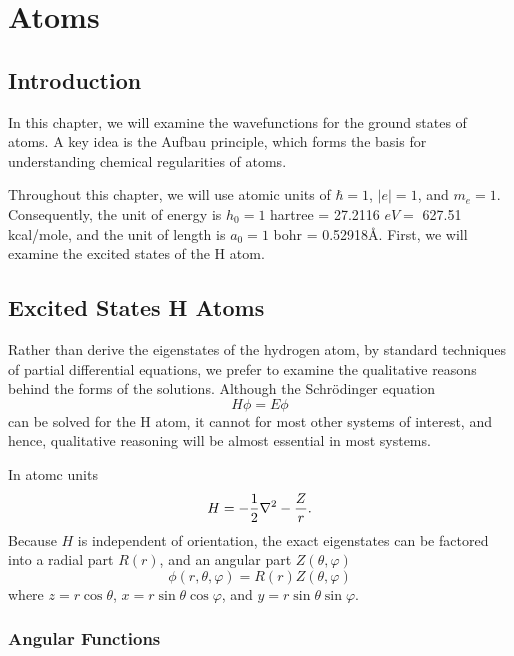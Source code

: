 \chapter{Atoms}
\label{chap05}

\section{Introduction}

In this chapter, we will examine the wavefunctions for the ground states 
of atoms.  A key idea is the Aufbau principle, which forms the basis for 
understanding chemical regularities of atoms.

Throughout this chapter, we will use atomic units of $\hbar = 1$, $| e | = 
1$, and $m_e = 1$.  Consequently, the unit of energy is $h_0 = 1$ 
hartree = 27.2116 $eV =$ 627.51 kcal/mole, and the unit of length is $a_0 = 
1$  bohr = 0.52918\AA.  First, we will examine the excited states of the H atom.

\section{Excited States H Atoms}

Rather than derive the eigenstates of the hydrogen atom, by standard techniques
of partial differential equations, we prefer to examine the qualitative 
reasons behind the forms of the solutions.  Although the Schr\"odinger equation
\begin{equation}
H \phi = E \phi
\end{equation}
can be solved for the H atom, it cannot for most other systems of interest, 
and hence, qualitative reasoning will be almost essential in most systems.

In atomc units
\begin{equation}
H = - {1 \over 2} \nabla^2 - {Z \over r} .
\label{chap5-eqno1}
\end{equation}
Because $H$ is independent of orientation, the exact eigenstates can 
be factored into a radial part $R(r)$, and an angular part $Z( \theta , 
\varphi)$
\begin{equation}
\phi ( r , \theta , \varphi ) = R ( r ) Z ( \theta , \varphi )
\end{equation}
where $z = r \cos \theta$, $x = r \sin \theta \cos \varphi$, and $y = r 
\sin \theta \sin \varphi$.

\subsection{Angular Functions}

